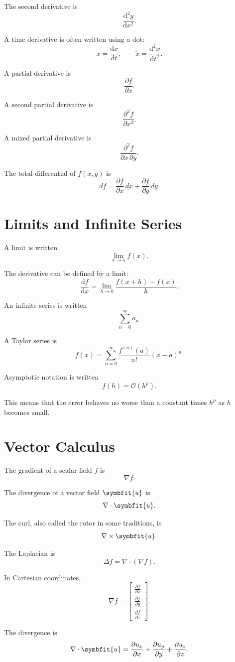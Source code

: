\documentclass[11pt,twocolumn]{article}
\newcommand{\vct}[1]{\symbfit{#1}}   %
\newcommand{\dv}[2]{\frac{\mathrm{d} #1}{\mathrm{d} #2}}
\newcommand{\dvtwo}[2]{\frac{\mathrm{d}^2 #1}{\mathrm{d} #2^2}}
\newcommand{\pdv}[2]{\frac{\partial #1}{\partial #2}}
\newcommand{\pdvtwo}[2]{\frac{\partial^2 #1}{\partial #2^2}}
\newcommand{\grad}{\nabla}
\newcommand{\divg}{\nabla \cdot}
\newcommand{\curlop}{\nabla \times}
\newcommand{\laplace}{\Delta}
\newcommand{\bigO}{\mathcal{O}}
\begin{document}
The second derivative is
\[
\dvtwo{y}{x}.
\]

A time derivative is often written using a dot:
\[
\dot{x}
=
\dv{x}{t},
\qquad
\ddot{x}
=
\dvtwo{x}{t}.
\]

A partial derivative is
\[
\pdv{f}{x}.
\]

A second partial derivative is
\[
\pdvtwo{f}{x}.
\]

A mixed partial derivative is
\[
\frac{\partial^2 f}{\partial x\,\partial y}.
\]

The total differential of \(f(x,y)\) is
\[
df
=
\pdv{f}{x}\,dx
+
\pdv{f}{y}\,dy.
\]

\section{Limits and Infinite Series}

A limit is written
\[
\lim_{x\to a} f(x).
\]

The derivative can be defined by a limit:
\[
\dv{f}{x}
=
\lim_{h\to 0}
\frac{f(x+h)-f(x)}{h}.
\]

An infinite series is written
\[
\sum_{n=0}^{\infty} a_n.
\]

A Taylor series is
\[
f(x)
=
\sum_{n=0}^{\infty}
\frac{f^{(n)}(a)}{n!}(x-a)^n.
\]

Asymptotic notation is written
\[
f(h)=\bigO(h^p).
\]

This means that the error behaves no worse than a constant times \(h^p\)
as \(h\) becomes small.

\section{Vector Calculus}

The gradient of a scalar field \(f\) is
\[
\grad f.
\]

The divergence of a vector field \(\vct{u}\) is
\[
\divg \vct{u}.
\]

The curl, also called the rotor in some traditions, is
\[
\curlop \vct{u}.
\]

The Laplacian is
\[
\laplace f
=
\divg(\grad f).
\]

In Cartesian coordinates,
\[
\grad f
=
\begin{bmatrix}
\pdv{f}{x} \\
\pdv{f}{y} \\
\pdv{f}{z}
\end{bmatrix}.
\]

The divergence is
\[
\divg \vct{u}
=
\pdv{u_x}{x}
+
\pdv{u_y}{y}
+
\pdv{u_z}{z}.
\]
\end{document}
